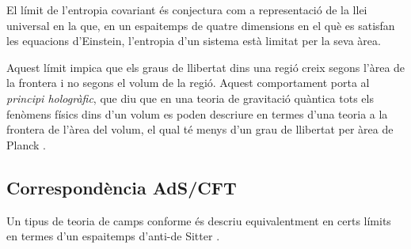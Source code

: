 \documentclass[lettersize,journal]{IEEEtran}
\begin{document}
El límit de l'entropia covariant \cite{bousso_covariant_1999} és conjectura com a representació de la llei universal en la que, en un espaitemps de quatre dimensions en el què es satisfan les equacions d'Einstein, l'entropia d'un sistema està limitat per la seva àrea.

Aquest límit impica que els graus de llibertat dins una regió creix segons l'àrea de la frontera i no segons el volum de la regió. Aquest comportament porta al \textit{principi hologràfic}, que diu que en una teoria de gravitació quàntica tots els fenòmens físics dins d'un volum es poden descriure en termes d'una teoria a la frontera de l'àrea del volum, el qual té menys d'un grau de llibertat per àrea de Planck \cite{t_hooft_dimensional_2009}.


\subsection{Correspondència AdS/CFT}

Un tipus de teoria de camps conforme és descriu equivalentment en certs límits en termes d'un espaitemps d'anti-de Sitter \cite{rangamani_holographic_2017}.
\end{document}
